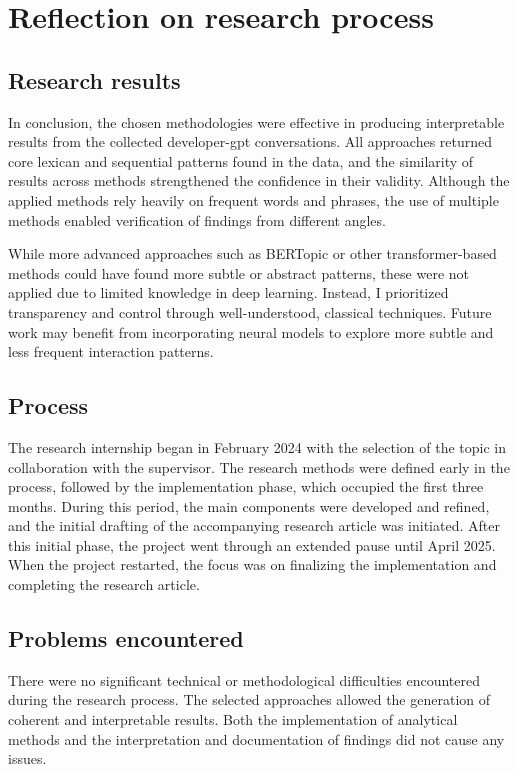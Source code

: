 \chapter{Reflection on research process}\label{reflection}
\section{Research results}
In conclusion, the chosen methodologies were effective in producing interpretable results from the collected developer-\acrshort{gpt} conversations. All approaches returned core lexican and sequential patterns found in the data, and the similarity of results across methods strengthened the confidence in their validity. Although the applied methods rely heavily on frequent words and phrases, the use of multiple methods enabled verification of findings from different angles.

While more advanced approaches such as BERTopic or other transformer-based methods could have found more subtle or abstract patterns, these were not applied due to limited knowledge in deep learning. Instead, I prioritized transparency and control through well-understood, classical techniques. Future work may benefit from incorporating neural models to explore more subtle and less frequent interaction patterns.

\section{Process}
The research internship began in February 2024 with the selection of the topic in collaboration with the supervisor. The research methods were defined early in the process, followed by the implementation phase, which occupied the first three months. During this period, the main components were developed and refined, and the initial drafting of the accompanying research article was initiated. After this initial phase, the project went through an extended pause until April 2025. When the project restarted, the focus was on finalizing the implementation and completing the research article.

\section{Problems encountered}
There were no significant technical or methodological difficulties encountered during the research process. The selected approaches allowed the generation of coherent and interpretable results. Both the implementation of analytical methods and the interpretation and documentation of findings did not cause any issues. 

